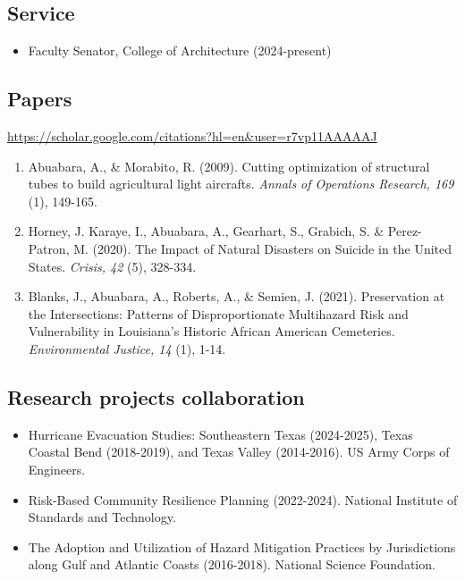 \documentclass[10pt]{article}
\begin{document}
\subsection*{Service}
\begin{itemize}
\item Faculty Senator, College of Architecture (2024-present)
\end{itemize}

\subsection*{Papers}
\url{https://scholar.google.com/citations?hl=en&user=r7vp11AAAAAJ}
\begin{enumerate}
\item Abuabara, A., \& Morabito, R. (2009). Cutting optimization of structural tubes to build agricultural light aircrafts. \emph{Annals of Operations Research, 169} (1), 149-165.
\item Horney, J. Karaye, I., Abuabara, A., Gearhart, S., Grabich, S. \& Perez-Patron, M. (2020). The Impact of Natural Disasters on Suicide in the United States. \emph{Crisis, 42} (5), 328-334.
\item Blanks, J., Abuabara, A., Roberts, A., \& Semien, J. (2021). Preservation at the Intersections: Patterns of Disproportionate Multihazard Risk and Vulnerability in Louisiana's Historic African American Cemeteries. \emph{Environmental Justice, 14} (1), 1-14.
\end{enumerate}

\subsection*{Research projects collaboration}
\begin{itemize}
\item Hurricane Evacuation Studies: Southeastern Texas (2024-2025), Texas Coastal Bend (2018-2019), and Texas Valley (2014-2016). US Army Corps of Engineers.
\item Risk-Based Community Resilience Planning (2022-2024). National Institute of Standards and Technology.
\item The Adoption and Utilization of Hazard Mitigation Practices by Jurisdictions along Gulf and Atlantic Coasts (2016-2018). National Science Foundation.
\end{itemize}
\end{document}
